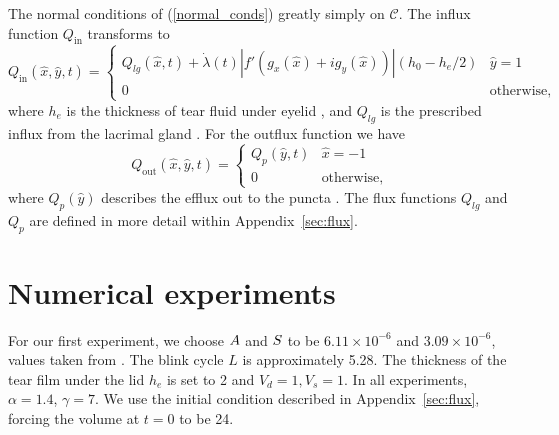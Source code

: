 The normal conditions of (\ref{normal_conds}) greatly simply on $\mathcal{C}$. The influx function $Q_{\text{in}}$ transforms to
\begin{equation}
Q_{\text{in}}(\hat{x},\hat{y},t) = \begin{cases}
Q_{lg}(\hat{x},t) + \dot{\lambda}(t)|f'(g_x(\hat{x})+i g_y(\hat{x}))|(h_0-h_e/2) & \hat{y}=1 \\
0 & \text{otherwise},
\end{cases}
\label{influx_fun}
\end{equation}
where $h_e$ is the thickness of tear fluid under eyelid \cite{heryudono2007single}, and $Q_{lg}$ is the prescribed influx from the lacrimal gland \cite{braun2015dynamics}. For the outflux function we have
\begin{equation}
Q_{\text{out}}(\hat{x},\hat{y},t) = \begin{cases}
Q_{p}(\hat{y},t) & \hat{x}=-1 \\
0 & \text{otherwise},
\end{cases}
\label{out_flux_fun}
\end{equation}
where $Q_{p}(\hat{y})$ describes the efflux out to the puncta \cite{braun2015dynamics}. The flux functions $Q_{lg}$ and $Q_p$ are defined in more detail within Appendix~\ref{sec:flux}.

\section{Numerical experiments}
\label{eye_experiments}
For our first experiment, we choose $A$ and $S$ to be $6.11 \times 10^{-6}$ and $3.09 \times 10^{-6}$, values taken from \cite{braun2015dynamics}. The blink cycle $L$ is approximately 5.28. The thickness of the tear film under the lid $h_e$ is set to 2 and $V_d=1, V_s=1$. In all experiments, $\alpha=1.4$, $\gamma=7$. We use the initial condition described in Appendix~\ref{sec:flux}, forcing the volume at $t=0$ to be 24.

